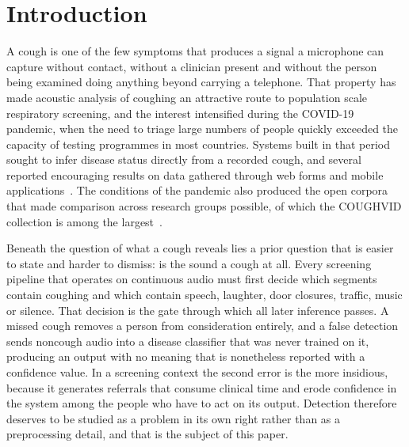 \documentclass[pdflatex,sn-mathphys-num]{sn-jnl}
\begin{document}

\maketitle

\section{Introduction}\label{sec:intro}

A cough is one of the few symptoms that produces a signal a microphone can
capture without contact, without a clinician present and without the person
being examined doing anything beyond carrying a telephone. That property has
made acoustic analysis of coughing an attractive route to population scale
respiratory screening, and the interest intensified during the COVID-19
pandemic, when the need to triage large numbers of people quickly exceeded the
capacity of testing programmes in most countries. Systems built in that period
sought to infer disease status directly from a recorded cough, and several
reported encouraging results on data gathered through web forms and mobile
applications~\cite{brown2020, imran2020, laguarta2020}. The conditions of the
pandemic also produced the open corpora that made comparison across research
groups possible, of which the COUGHVID collection is among the
largest~\cite{orlandic2021}.

Beneath the question of what a cough reveals lies a prior question that is
easier to state and harder to dismiss: is the sound a cough at all. Every
screening pipeline that operates on continuous audio must first decide which
segments contain coughing and which contain speech, laughter, door closures,
traffic, music or silence. That decision is the gate through which all later
inference passes. A missed cough removes a person from consideration entirely,
and a false detection sends noncough audio into a disease classifier that was
never trained on it, producing an output with no meaning that is nonetheless
reported with a confidence value. In a screening context the second error is
the more insidious, because it generates referrals that consume clinical time
and erode confidence in the system among the people who have to act on its
output. Detection therefore deserves to be studied as a problem in its own
right rather than as a preprocessing detail, and that is the subject of this
paper.
\end{document}
